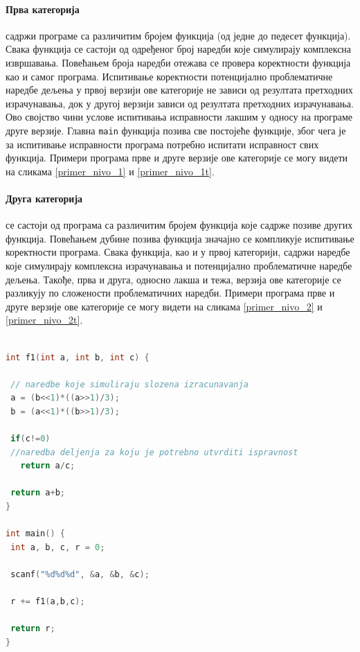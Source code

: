 \documentclass[12pt,oneside]{memoir}
\begin{document}
\paragraph{Прва категорија} садржи програме са различитим бројем функција (од једне до педесет функција). Свака функција се састоји од одређеног број наредби које симулирају комплексна извршавања. Повећањем броја наредби отежава се провера коректности функција као и самог програма. Испитивање коректности потенцијално проблематичне наредбе дељења у првој верзији ове категорије не зависи од резултата претходних израчунавања, док у другој верзији зависи од резултата претходних израчунавања. Ово својство чини услове испитивања исправности лакшим у односу на програме друге верзије. Главна \texttt{main} функција позива све постојеће функције, због чега је за испитивање исправности програма потребно испитати исправност свих функција. Примери програма прве и друге верзије ове категорије се могу видети на сликама \ref{primer_nivo_1} и \ref{primer_nivo_1t}.

\paragraph{Друга категорија} се састоји од програма са различитим бројем функција које садрже позиве других функција. Повећањем дубине позива функција значајно се компликује испитивање коректности програма. Свака функција, као и у првој категорији, садржи наредбе које симулирају комплексна израчунавања и потенцијално проблематичне наредбе дељења. Такође, прва и друга, односно лакша и тежа, верзија ове категорије се разликују по сложености проблематичних наредби. Примери програма прве и друге верзије ове категорије се могу видети на сликама \ref{primer_nivo_2} и \ref{primer_nivo_2t}.
 
\begin{lstlisting}[basicstyle=\fontsize{4}{4}\selectfont,language=C,frame=single,caption=Пример програма прве категорије (прва верзија),label=primer_nivo_1]

int f1(int a, int b, int c) {

 // naredbe koje simuliraju slozena izracunavanja
 a = (b<<1)*((a>>1)/3);
 b = (a<<1)*((b>>1)/3);
  
 if(c!=0)
 //naredba deljenja za koju je potrebno utvrditi ispravnost
   return a/c;
   
 return a+b;
}

int main() {
 int a, b, c, r = 0;
 
 scanf("%d%d%d", &a, &b, &c);
 
 r += f1(a,b,c);
 
 return r;
}

\end{lstlisting}
\end{document}
